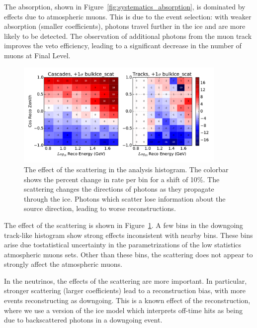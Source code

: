 The absorption, shown in Figure~\ref{fig:systematics_absorption}, is dominated by effects due to atmospheric muons.
This is due to the event selection: with weaker absorption (smaller coefficients), photons travel further in the ice and are more likely to be detected.
The observation of additional photons from the muon track improves the veto efficiency, leading to a significant decrease in the number of muons at Final Level.

\begin{figure}
\centering
\includegraphics[width=0.9\textwidth]{systematics/bulkIce_scat_variation.pdf} 
\caption[Effect of the scattering in the analysis histogram]{The effect of the scattering in the analysis histogram. The colorbar shows the percent change in rate per bin for a shift of 10\%. The scattering changes the directions of photons as they propagate through the ice. Photons which scatter lose information about the source direction, leading to worse reconstructions. }
\label{fig:systematics_scattering}
\end{figure}

The effect of the scattering is shown in Figure~\ref{fig:systematics_scattering}.
A few bins in the downgoing track-like histogram show strong effects inconsistent with nearby bins. 
These bins arise due tostatistical uncertainty in the parametrizations of the low statistics atmospheric muons sets.
Other than these bins, the scattering does not appear to strongly affect the atmospheric muons.

In the neutrinos, the effects of the scattering are more important.
In particular, stronger scattering (larger coefficients) lead to a reconstruction bias, with more events reconstructing as downgoing.
This is a known effect of the reconstruction, where we use a version of the ice model which interprets off-time hits as being due to backscattered photons in a downgoing event.





